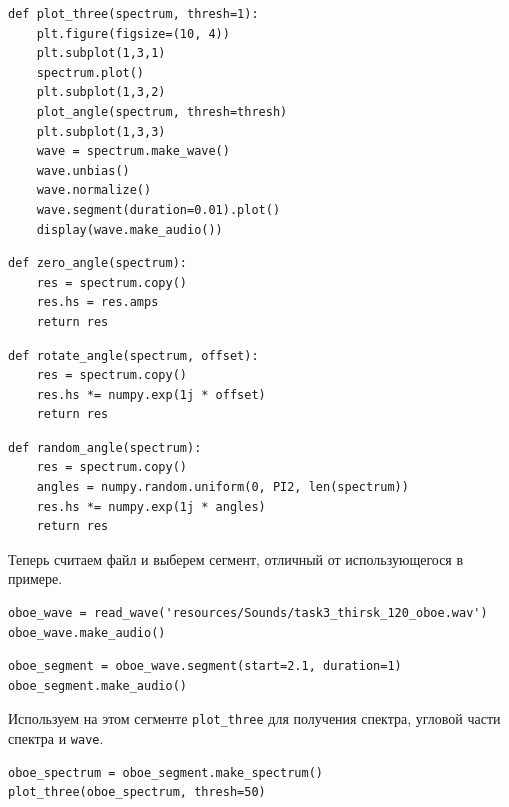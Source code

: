 \documentclass[a4paper, 14pt]{extarticle}
\begin{document}
    \begin{lstlisting}[caption= Функция \texttt{plot\_three}., label={lst:task3_plot_three}]
def plot_three(spectrum, thresh=1):
    plt.figure(figsize=(10, 4))
    plt.subplot(1,3,1)
    spectrum.plot()
    plt.subplot(1,3,2)
    plot_angle(spectrum, thresh=thresh)
    plt.subplot(1,3,3)
    wave = spectrum.make_wave()
    wave.unbias()
    wave.normalize()
    wave.segment(duration=0.01).plot()
    display(wave.make_audio())      \end{lstlisting}

    \begin{lstlisting}[caption= Функция \texttt{zero\_angle}., label={lst:task3_zero_angle}]
def zero_angle(spectrum):
    res = spectrum.copy()
    res.hs = res.amps
    return res  \end{lstlisting}

    \begin{lstlisting}[caption= Функция \texttt{rotate\_angle}., label={lst:task3_rotate_angle}]
def rotate_angle(spectrum, offset):
    res = spectrum.copy()
    res.hs *= numpy.exp(1j * offset)
    return res      \end{lstlisting}

    \begin{lstlisting}[caption= Функция \texttt{random\_angle}., label={lst:task3_random_angle}]
def random_angle(spectrum):
    res = spectrum.copy()
    angles = numpy.random.uniform(0, PI2, len(spectrum))
    res.hs *= numpy.exp(1j * angles)
    return res      \end{lstlisting}

    Теперь считаем файл и выберем сегмент, отличный от использующегося в примере.

    \begin{lstlisting}[caption= Чтение файла., label={lst:task3_read}]
oboe_wave = read_wave('resources/Sounds/task3_thirsk_120_oboe.wav')
oboe_wave.make_audio()  \end{lstlisting}

    \begin{lstlisting}[caption= Выбор сегмента., label={lst:task3_segment}]
oboe_segment = oboe_wave.segment(start=2.1, duration=1)
oboe_segment.make_audio()
    \end{lstlisting}

    Используем на этом сегменте \texttt{plot\_three} для получения спектра, угловой части спектра и \texttt{wave}.

    \begin{lstlisting}[caption= Применение \texttt{plot\_three} к оригинальному сегменту., label={lst:task3_three}]
oboe_spectrum = oboe_segment.make_spectrum()
plot_three(oboe_spectrum, thresh=50)    \end{lstlisting}
\end{document}
